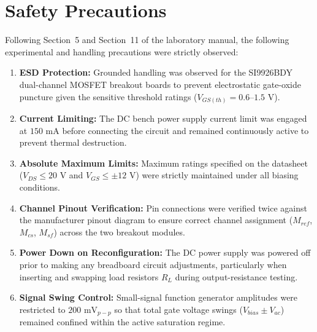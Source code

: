 \documentclass[11pt, a4paper]{article}
\begin{document}
\clearpage
\section{Safety Precautions}
Following Section~5 and Section~11 of the laboratory manual, the following experimental and handling precautions were strictly observed:
\begin{enumerate}
    \item \textbf{ESD Protection:} Grounded handling was observed for the SI9926BDY dual-channel MOSFET breakout boards to prevent electrostatic gate-oxide puncture given the sensitive threshold ratings ($V_{GS(th)} = 0.6\text{--}1.5\text{ V}$).
    \item \textbf{Current Limiting:} The DC bench power supply current limit was engaged at $150\text{ mA}$ before connecting the circuit and remained continuously active to prevent thermal destruction.
    \item \textbf{Absolute Maximum Limits:} Maximum ratings specified on the datasheet ($V_{DS} \le 20\text{ V}$ and $V_{GS} \le \pm 12\text{ V}$) were strictly maintained under all biasing conditions.
    \item \textbf{Channel Pinout Verification:} Pin connections were verified twice against the manufacturer pinout diagram to ensure correct channel assignment ($M_{ref}$, $M_{cs}$, $M_{sf}$) across the two breakout modules.
    \item \textbf{Power Down on Reconfiguration:} The DC power supply was powered off prior to making any breadboard circuit adjustments, particularly when inserting and swapping load resistors $R_L$ during output-resistance testing.
    \item \textbf{Signal Swing Control:} Small-signal function generator amplitudes were restricted to $200\text{ mV}_{p-p}$ so that total gate voltage swings ($V_{bias} \pm V_{ac}$) remained confined within the active saturation regime.
\end{enumerate}
\end{document}
